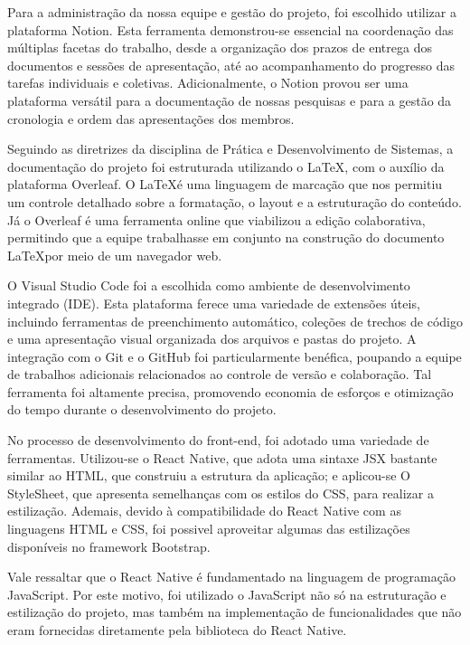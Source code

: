 \documentclass[
    article,			%
    12pt,				%
    oneside,            %
    a4paper,			%
    english,			%
    brazil,				%
    ]{abntex2}
\begin{document}
    Para a administração da nossa equipe e gestão do projeto, foi escolhido utilizar a plataforma Notion. Esta ferramenta demonstrou-se essencial na coordenação das múltiplas facetas do trabalho, desde a organização dos prazos de entrega dos documentos e sessões de apresentação, até ao acompanhamento do progresso das tarefas individuais e coletivas. Adicionalmente, o Notion provou ser uma plataforma versátil para a documentação de nossas pesquisas e para a gestão da cronologia e ordem das apresentações dos membros.
    
    Seguindo as diretrizes da disciplina de Prática e Desenvolvimento de Sistemas, a documentação do projeto foi estruturada utilizando o \LaTeX, com o auxílio da plataforma Overleaf. O \LaTeX \space é uma linguagem de marcação que nos permitiu um controle detalhado sobre a formatação, o layout e a estruturação do conteúdo. Já o Overleaf é uma ferramenta online que viabilizou a edição colaborativa, permitindo que a equipe trabalhasse em conjunto na construção do documento \LaTeX \space por meio de um navegador web.
    
    O Visual Studio Code foi a escolhida como ambiente de desenvolvimento integrado (IDE). Esta plataforma ferece uma variedade de extensões úteis, incluindo ferramentas de preenchimento automático, coleções de trechos de código e uma apresentação visual organizada dos arquivos e pastas do projeto. A integração com o Git e o GitHub foi particularmente benéfica, poupando a equipe de trabalhos adicionais relacionados ao controle de versão e colaboração. Tal ferramenta foi altamente precisa, promovendo economia de esforços e otimização do tempo durante o desenvolvimento do projeto.
    
    No processo de desenvolvimento do front-end, foi adotado uma variedade de ferramentas. Utilizou-se o React Native, que adota uma sintaxe JSX bastante similar ao HTML, que construiu a estrutura da aplicação; e aplicou-se O StyleSheet, que apresenta semelhanças com os estilos do CSS, para realizar a estilização. Ademais, devido à compatibilidade do React Native com as linguagens HTML e CSS, foi possivel aproveitar algumas das estilizações disponíveis no framework Bootstrap.
        
    Vale ressaltar que o React Native é fundamentado na linguagem de programação JavaScript. Por este motivo, foi utilizado o JavaScript não só na estruturação e estilização do projeto, mas também na implementação de funcionalidades que não eram fornecidas diretamente pela biblioteca do React Native.
    
\end{document}
